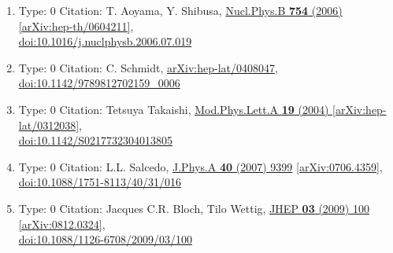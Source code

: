 \documentclass[a4paper,10pt]{article}
\begin{document}
\begin{enumerate}
\begin{enumerate}
  \item Type: 0 Citation: T. Aoyama, Y. Shibusa, \href{https://www.doi.org/10.1016/j.nuclphysb.2006.07.019}{Nucl.Phys.B {\bf 754} (2006) }  \href{https://arxiv.org/abs/hep-th/0604211}{[arXiv:hep-th/0604211]},\\\href{https://www.doi.org/10.1016/j.nuclphysb.2006.07.019}{doi:10.1016/j.nuclphysb.2006.07.019}
  \item Type: 0 Citation: C. Schmidt, \href{https://arxiv.org/abs/hep-lat/0408047}{arXiv:hep-lat/0408047},\\\href{https://www.doi.org/10.1142/9789812702159_0006}{doi:10.1142/9789812702159\_0006}
  \item Type: 0 Citation: Tetsuya Takaishi, \href{https://www.doi.org/10.1142/S0217732304013805}{Mod.Phys.Lett.A {\bf 19} (2004) }  \href{https://arxiv.org/abs/hep-lat/0312038}{[arXiv:hep-lat/0312038]},\\\href{https://www.doi.org/10.1142/S0217732304013805}{doi:10.1142/S0217732304013805}
  \item Type: 0 Citation: L.L. Salcedo, \href{https://www.doi.org/10.1088/1751-8113/40/31/016}{J.Phys.A {\bf 40} (2007) 9399}  \href{https://arxiv.org/abs/0706.4359}{[arXiv:0706.4359]},\\\href{https://www.doi.org/10.1088/1751-8113/40/31/016}{doi:10.1088/1751-8113/40/31/016}
  \item Type: 0 Citation: Jacques C.R. Bloch, Tilo Wettig, \href{https://www.doi.org/10.1088/1126-6708/2009/03/100}{JHEP {\bf 03} (2009) 100}  \href{https://arxiv.org/abs/0812.0324}{[arXiv:0812.0324]},\\\href{https://www.doi.org/10.1088/1126-6708/2009/03/100}{doi:10.1088/1126-6708/2009/03/100}

\end{enumerate}
\end{enumerate}
\end{document}
